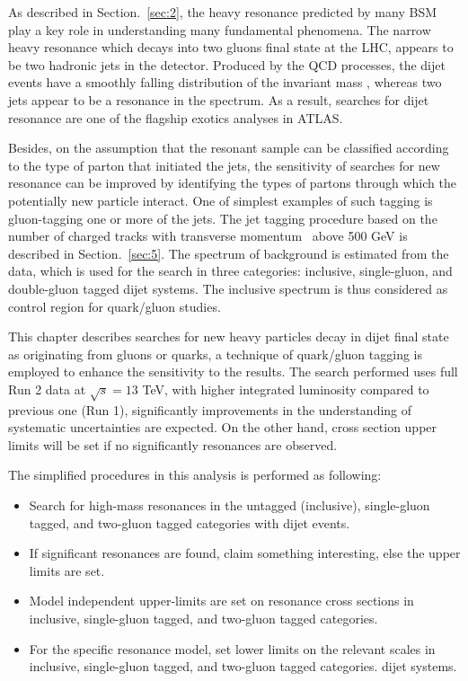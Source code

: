 As described in Section.~\ref{sec:2}, the heavy resonance predicted by many BSM play a key role in understanding many fundamental phenomena. The narrow heavy resonance which decays into two gluons final state at the LHC, appears to be two hadronic jets in the detector. Produced by the QCD processes, the dijet events have a smoothly falling distribution of the invariant mass \mjj, whereas two jets appear to be a resonance in the \mjj spectrum. As a result, searches for dijet resonance are one of the flagship exotics analyses in ATLAS.


Besides, on the assumption that the resonant sample can be classified according to the type of parton that initiated the jets, the sensitivity of searches for new resonance can be improved by identifying the types of partons through which the potentially new particle interact.  One of simplest examples of such tagging is gluon-tagging one or more of the jets. The jet tagging procedure based on the number of
charged tracks with transverse momentum \pt~above 500 GeV is described in Section.~\ref{sec:5}. The \mjj spectrum of background is estimated from the data, which is used for the search in three categories: inclusive, single-gluon, and double-gluon tagged dijet systems. The inclusive \mjj spectrum is thus considered as control region for quark/gluon studies.



This chapter describes searches for new heavy particles decay in dijet final state as originating from gluons or quarks, a technique of quark/gluon tagging is employed to enhance the sensitivity to the results. The search performed uses full Run 2 data at $\sqrt{s} = 13$ TeV, with higher integrated luminosity compared to previous one (Run 1), significantly improvements in the understanding of systematic uncertainties are expected. On the other hand,  cross section upper limits will be set if no significantly resonances are observed.

The simplified procedures in this analysis is performed as following: 
\begin{itemize}
	\item Search for high-mass resonances in the untagged (inclusive), single-gluon tagged,
	and two-gluon tagged categories with dijet events.
	\item If significant resonances are found, claim something interesting, else the upper limits are set. 
	\item Model independent upper-limits are set on resonance cross sections in
	inclusive, single-gluon tagged, and two-gluon tagged categories.
	\item For the specific resonance model, set lower limits on the relevant scales in inclusive, single-gluon tagged, and two-gluon tagged categories.
	dijet systems.
\end{itemize}

